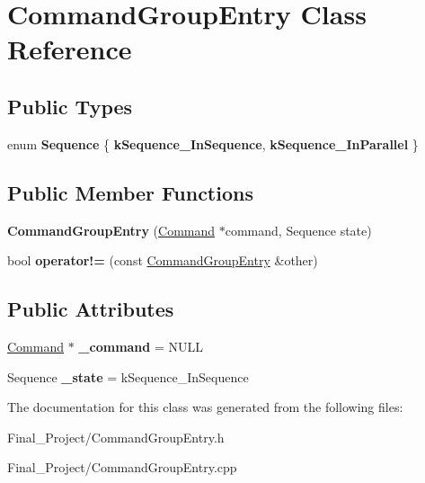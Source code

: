 \hypertarget{classCommandGroupEntry}{\section{Command\-Group\-Entry Class Reference}
\label{classCommandGroupEntry}
}
\subsection*{Public Types}
\begin{DoxyCompactItemize}
\item 
enum {\bfseries Sequence} \{ {\bfseries k\-Sequence\-\_\-\-In\-Sequence}, 
{\bfseries k\-Sequence\-\_\-\-In\-Parallel}
 \}
\end{DoxyCompactItemize}
\subsection*{Public Member Functions}
\begin{DoxyCompactItemize}
\item 
\hypertarget{classCommandGroupEntry_a638a9b82f73e4aa5b268eaad4a1c95de}{{\bfseries Command\-Group\-Entry} (\hyperlink{classCommand}{Command} $\ast$command, Sequence state)}\label{classCommandGroupEntry_a638a9b82f73e4aa5b268eaad4a1c95de}

\item 
\hypertarget{classCommandGroupEntry_ad12a901f2d52aa1da54020c118f222a5}{bool {\bfseries operator!=} (const \hyperlink{classCommandGroupEntry}{Command\-Group\-Entry} \&other)}\label{classCommandGroupEntry_ad12a901f2d52aa1da54020c118f222a5}

\end{DoxyCompactItemize}
\subsection*{Public Attributes}
\begin{DoxyCompactItemize}
\item 
\hypertarget{classCommandGroupEntry_a466202de6dd9aed12db553da04c726b2}{\hyperlink{classCommand}{Command} $\ast$ {\bfseries \-\_\-command} = N\-U\-L\-L}\label{classCommandGroupEntry_a466202de6dd9aed12db553da04c726b2}

\item 
\hypertarget{classCommandGroupEntry_a3a011ee2d2c871fce8a37dd3cb3d1ddf}{Sequence {\bfseries \-\_\-state} = k\-Sequence\-\_\-\-In\-Sequence}\label{classCommandGroupEntry_a3a011ee2d2c871fce8a37dd3cb3d1ddf}

\end{DoxyCompactItemize}


The documentation for this class was generated from the following files\-:\begin{DoxyCompactItemize}
\item 
Final\-\_\-\-Project/Command\-Group\-Entry.\-h\item 
Final\-\_\-\-Project/Command\-Group\-Entry.\-cpp\end{DoxyCompactItemize}
